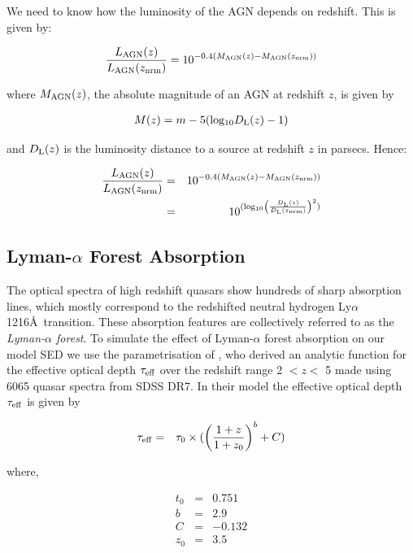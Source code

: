 We need to know how the luminosity of the AGN depends on redshift. 
This is given by:

\begin{eqnarray}
  \frac{L_{\rm AGN}(z)}{L_{\rm AGN}(z_{\rm nrm})} = 10^{-0.4(M_{\rm AGN}(z)-M_{\rm AGN}(z_{\rm nrm}))}
\end{eqnarray}

where $M_{\rm AGN}(z)$, the absolute magnitude of an AGN at redshift $z$, is given by

\begin{eqnarray}
  M(z) = m - 5({\rm log_{10}}D_{\rm L}(z) - 1)
\end{eqnarray}

and $D_{\rm L}(z)$ is the luminosity distance to a source at redshift $z$ in parsecs. 
Hence:

\begin{eqnarray}
  \frac{L_{\rm AGN}(z)}{L_{\rm AGN}(z_{\rm nrm})} & = & 10^{-0.4(M_{\rm AGN}(z)-M_{\rm AGN}(z_{\rm nrm}))} \\
  & = & 10^{({\rm log_{10}} \left( \frac{D_{\rm L}(z)}{D_{\rm L}(z_{\rm nrm})} \right)^2 )}
\end{eqnarray}

\subsection{Lyman-$\alpha$ Forest Absorption}

The optical spectra of high redshift quasars show hundreds of sharp absorption lines, which mostly correspond to the redshifted neutral hydrogen Ly$\alpha$ 1216\AA~transition. 
These absorption features are collectively referred to as the {\it Lyman-$\alpha$ forest}. 
To simulate the effect of Lyman-$\alpha$ forest absorption on our model SED we use the parametrisation of \citet{becker13}, who derived an analytic function for the effective optical depth $\tau_{\rm eff}$ over the redshift range 2 $< z <$ 5 made using 6065 quasar spectra from SDSS DR7. 
In their model the effective optical depth $\tau_{\rm eff}$ is given by 

\begin{eqnarray}
  \label{eq:taueff}
  \tau_{\rm eff} & = & \tau_0 \times ( \left( \frac{ 1 + z }{ 1 + z_0 } \right)^b + C )
\end{eqnarray}

where,

\begin{eqnarray*}
  t_0 & = & 0.751 \\
  b & = & 2.9 \\
  C & = & -0.132 \\
  z_0 & = & 3.5 
\end{eqnarray*}

